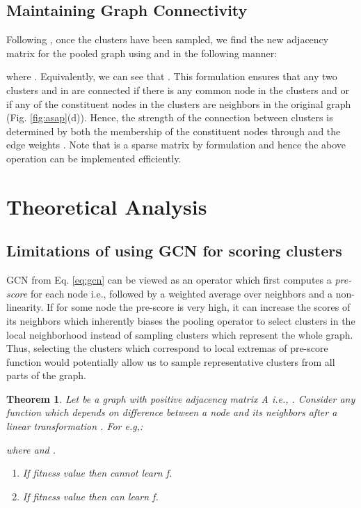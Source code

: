 \documentclass[letterpaper]{article} \usepackage{aaai20}  \usepackage{times}  \usepackage{helvet} \usepackage{courier}  \usepackage[hyphens]{url}  \usepackage{graphicx} \urlstyle{rm} \def\UrlFont{\rm}  \usepackage{graphicx}  \frenchspacing  \setlength{\pdfpagewidth}{8.5in}  \setlength{\pdfpageheight}{11in}
\newtheorem{theorem}{Theorem}
\begin{document}
\subsection{Maintaining Graph Connectivity}
\label{ssec:graph-connectivity}
Following \cite{diffpool}, once the clusters have been sampled, we find the new adjacency matrix  for the pooled graph  using  and  in the following manner:

where . Equivalently, we can see that . This formulation ensures that any two clusters  and  in  are connected if there is any common node in the clusters  and  or if any of the constituent nodes in the clusters are neighbors in the original graph  (Fig. \ref{fig:asap}(d)). Hence, the strength of the connection between clusters is determined by both the membership of the constituent nodes through  and the edge weights . Note that  is a sparse matrix by formulation and hence the above operation can be implemented efficiently.



 
\section{Theoretical Analysis}
\subsection{Limitations of using GCN for scoring clusters}

\label{ssec:leconv-use}
GCN from Eq. \eqref{eq:gcn} can be viewed as an operator which first computes a \textit{pre-score}  for each node i.e.,  followed by a weighted average over neighbors and a non-linearity. If for some node the pre-score is very high, it can increase the scores of its neighbors which inherently biases the pooling operator to select clusters in the local neighborhood instead of sampling clusters which represent the whole graph. Thus, selecting the clusters which correspond to local extremas of pre-score function would potentially allow us to sample representative clusters from all parts of the graph. 







\begin{theorem}
	\label{thm:gcn-score}
	Let  be a graph with positive adjacency matrix A i.e., . Consider any function  which depends on difference between a node and its neighbors after a linear transformation . For e.g,:
	
	 where  and .
	
	\begin{enumerate}[label=\alph*)]
		\item If fitness value  then  cannot learn f.
		\item If fitness value  then  can learn f.
	\end{enumerate}
\end{theorem}
\end{document}
